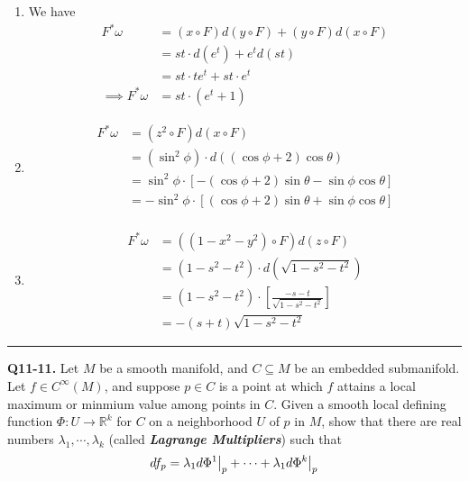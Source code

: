 \documentclass{article}
\newcommand{\R}{\mathbb{R}}
\newcommand{\restr}[2]{{%
  \left.\kern-\nulldelimiterspace %
  #1 %
  \vphantom{\big|} %
  \right|_{#2} %
  }}
\begin{document}
\begin{enumerate}[label=(\alph*)]
  \item We have 
  \begin{align*}
    F^* \omega &= \left(x \circ F\right) d\left(y \circ F\right) + \left(y \circ F\right)d\left(x \circ F\right) \\
    &= st \cdot d\left( e^t \right) + e^t d\left( st \right) \\
    &= st \cdot te^t + st \cdot e^t \\
  \implies F^*\omega &= st\cdot (e^{t} + 1)
  \end{align*}

  \vskip 0.5cm
  \item \begin{align*}
    F^*\omega &= \left( z^2 \circ F \right) d\left(x \circ F\right) \\
    &= \left( \sin^2\phi \right) \cdot d \left( \left( \cos\phi  + 2\right) \cos\theta \right) \\
    &= \sin^2\phi \cdot \left[ -\left(\cos\phi + 2\right)\sin\theta - \sin\phi \cos\theta \right] \\
    &=-\sin^2\phi \cdot \left[ \left(\cos\phi + 2\right)\sin\theta + \sin\phi \cos\theta \right] \\
  \end{align*}

  \vskip 0.5cm
  \item \begin{align*}
    F^* \omega &= \left((1-x^2-y^2) \circ F\right) d\left( z \circ F \right) \\
    &= \left(1-s^2-t^2\right) \cdot d\left(\sqrt{1-s^2-t^2}\right) \\
    &= \left(1-s^2-t^2\right) \cdot \left[ \frac{-s -t}{\sqrt{1-s^2-t^2}} \right] \\
    &= -(s+t)\sqrt{1-s^2-t^2}
  \end{align*}
\end{enumerate}


\vskip 0.5cm
\hrule 
\vskip 0.5cm


\textbf{Q11-11.} Let $M$ be a smooth manifold, and $C \subseteq M$ be an embedded submanifold. Let $f \in C^{\infty}(M)$, and suppose $p \in C$ is a point at which $f$ attains a local maximum or minmium value among points in $C$. Given a smooth local defining function $\Phi : U \rightarrow \R^k$ for $C$ on a neighborhood $U$ of $p$ in $M$, show that there are real numbers $\lambda_1, \cdots, \lambda_k$ (called \emph{\textbf{Lagrange Multipliers}}) such that 
\[ df_p = \lambda_1 \restr{d\Phi^1}{p} + \cdots + \lambda_1 \restr{d\Phi^k}{p} \] 
\end{document}

